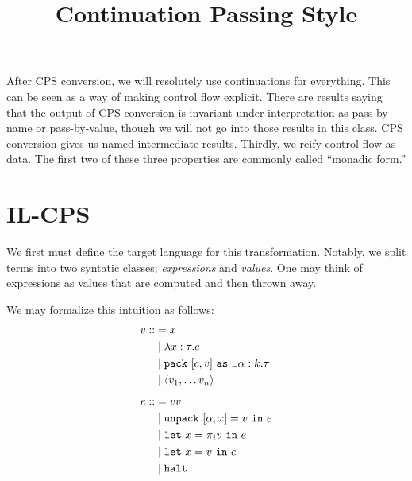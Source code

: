 \documentclass{amsart}
\title{Continuation Passing Style}
\newcommand{\pack}{\text{\texttt{pack} }}
\newcommand{\unpack}{\text{\texttt{unpack} }}
\newcommand{\iin}{\text{ \texttt{in} }}
\newcommand{\halt}{\text{\texttt{halt}}}
\newcommand{\llet}{\text{\texttt{let} }}
\newcommand{\as}{\text{ \texttt{as} }}
\begin{document}
\maketitle

After CPS conversion, we will resolutely use continuations for everything. This can be seen as a way of making control flow explicit. There are results saying that the output of CPS conversion is invariant under interpretation as pass-by-name or pass-by-value, though we will not go into those results in this class. CPS conversion gives us named intermediate results. Thirdly, we reify control-flow as data. The first two of these three properties are commonly called ``monadic form.''

\section{IL-CPS}

We first must define the target language for this transformation. Notably, we split terms into two syntatic classes; \emph{expressions} and \emph{values}. One may think of expressions as values that are computed and then thrown away.

We may formalize this intuition as follows:
\begin{align*}
v ::&= x\\
&\mid \lambda x : \tau . e\\
&\mid \pack [c,v] \as \exists \alpha : k .\tau\\
&\mid \langle v_1, \ldots v_n \rangle\\[1ex]
e ::&= v v \\
&\mid \unpack [\alpha, x] = v \iin e\\
&\mid \llet x = \pi_i v \iin e\\
&\mid \llet x = v \iin e\\
&\mid \halt
\end{align*}
\end{document}
